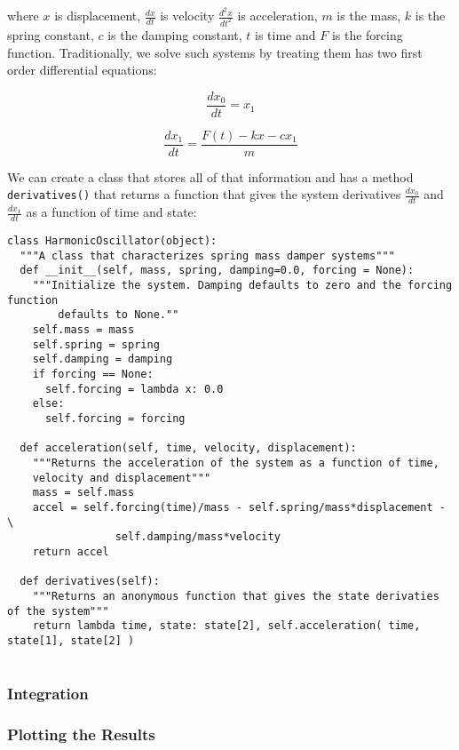 \documentclass{report}
\begin{document}
where \(x\) is displacement, \(\frac{dx}{dt}\) is velocity \(\frac{d^2x}{dt^2}\) is acceleration, \(m\) is the mass, \(k\) is the spring constant, \(c\) is the damping constant, \(t\) is time and \(F\) is the forcing function. Traditionally, we solve such systems by treating them has two first order differential equations:

\begin{displaymath}
\frac{dx_0}{dt} = x_1
\end{displaymath}

\begin{displaymath}
\frac{dx_1}{dt} =  \frac{F(t)-kx-c x_1}{m}
\end{displaymath}


We can create a class that stores all of that information and has a method \verb|derivatives()| that returns a function that gives the system derivatives \(\frac{dx_0}{dt}\) and \(\frac{dx_1}{dt}\) as a function of time and state:

\begin{verbatim}
class HarmonicOscillator(object):
  """A class that characterizes spring mass damper systems"""
  def __init__(self, mass, spring, damping=0.0, forcing = None):
    """Initialize the system. Damping defaults to zero and the forcing function 
        defaults to None.""
    self.mass = mass
    self.spring = spring
    self.damping = damping
    if forcing == None:
      self.forcing = lambda x: 0.0
    else:
      self.forcing = forcing

  def acceleration(self, time, velocity, displacement):
    """Returns the acceleration of the system as a function of time, 
    velocity and displacement"""
    mass = self.mass
    accel = self.forcing(time)/mass - self.spring/mass*displacement - \
                 self.damping/mass*velocity
    return accel

  def derivatives(self):
    """Returns an anonymous function that gives the state derivaties of the system"""
    return lambda time, state: state[2], self.acceleration( time, state[1], state[2] )
      
\end{verbatim}

\subsubsection{Integration}

\subsubsection{Plotting the Results}
\end{document}
